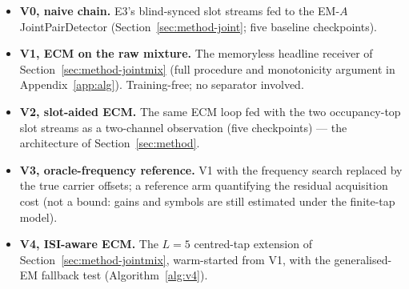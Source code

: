 \documentclass[journal]{IEEEtran}
\begin{document}
\begin{itemize}
  \item \textbf{V0, naive chain.} E3's blind-synced slot streams fed to
        the EM-$A$ JointPairDetector (Section~\ref{sec:method-joint};
        five baseline checkpoints).
  \item \textbf{V1, ECM on the raw mixture.} The memoryless headline
        receiver of Section~\ref{sec:method-jointmix} (full procedure
        and monotonicity argument in Appendix~\ref{app:alg}).
        Training-free; no separator involved.
  \item \textbf{V2, slot-aided ECM.} The same ECM loop fed with the two
        occupancy-top slot streams as a two-channel observation (five
        checkpoints) --- the architecture of Section~\ref{sec:method}.
  \item \textbf{V3, oracle-frequency reference.} V1 with the frequency
        search replaced by the true carrier offsets; a reference arm
        quantifying the residual acquisition cost (not a bound: gains
        and symbols are still estimated under the finite-tap model).
  \item \textbf{V4, ISI-aware ECM.} The $L{=}5$ centred-tap
        extension of Section~\ref{sec:method-jointmix}, warm-started
        from V1, with the generalised-EM fallback test
        (Algorithm~\ref{alg:v4}).
\end{itemize}
\end{document}
